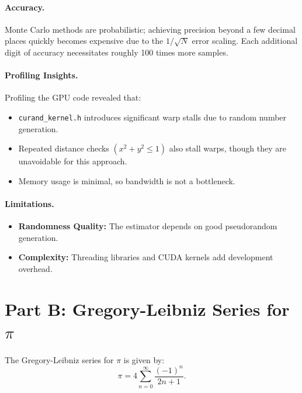 \documentclass[12pt]{article}
\begin{document}
\paragraph{Accuracy.}
Monte Carlo methods are probabilistic; achieving precision beyond a few decimal
places quickly becomes expensive due to the \(1/\sqrt{N}\) error scaling. Each
additional digit of accuracy necessitates roughly 100 times more samples.

\paragraph{Profiling Insights.}
Profiling the GPU code revealed that:
\begin{itemize}
      \item \texttt{curand\_kernel.h} introduces significant warp stalls due to random
            number generation.
      \item Repeated distance checks \((x^2 + y^2 \le 1)\) also stall warps, though they
            are unavoidable for this approach.
      \item Memory usage is minimal, so bandwidth is not a bottleneck.
\end{itemize}

\paragraph{Limitations.}
\begin{itemize}
      \item \textbf{Randomness Quality:} The estimator depends on good pseudorandom generation.
      \item \textbf{Complexity:} Threading libraries and CUDA kernels add development overhead.
\end{itemize}

\section{Part B: Gregory-Leibniz Series for \texorpdfstring{\(\pi\)}{pi}}
The Gregory-Leibniz series for \(\pi\) is given by:
\[
      \pi = 4 \sum_{n=0}^{\infty} \frac{(-1)^n}{2n + 1}.
\]
\end{document}
